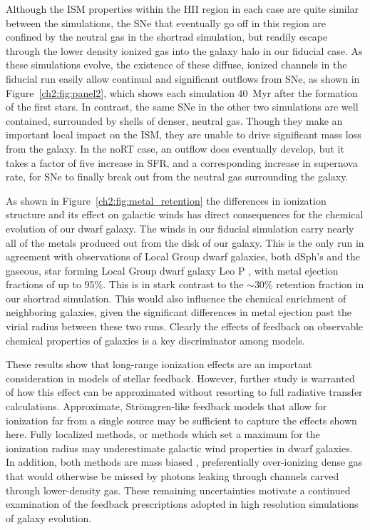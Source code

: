 Although the ISM properties within the HII region in each case are quite similar between the simulations, the SNe that eventually go off in this region are confined by the neutral gas in the shortrad simulation, but readily escape through the lower density ionized gas into the galaxy halo in our fiducial case. As these simulations evolve, the existence of these diffuse, ionized channels in the fiducial run easily allow continual and significant outflows from SNe, as shown in  Figure~\ref{ch2:fig:panel2}, which shows each simulation 40~Myr after the formation of the first stars. In contrast, the same SNe in the other two simulations are well contained, surrounded by shells of denser, neutral gas. Though they make an important local impact on the ISM, they are unable to drive significant mass loss from the galaxy. In the noRT case, an outflow does eventually develop, but it takes a factor of five increase in SFR, and a corresponding increase in supernova rate, for SNe to finally break out from the neutral gas surrounding the galaxy.

As shown in Figure~\ref{ch2:fig:metal_retention} the differences in ionization structure and its effect on galactic winds has direct consequences for the chemical evolution of our dwarf galaxy. The winds in our fiducial simulation carry nearly all of the metals produced out from the disk of our galaxy. This is the only run in agreement with observations of Local Group dwarf galaxies, both dSph's \citep{Kirby2011} and the gaseous, star forming Local Group dwarf galaxy Leo P \citep{McQuinn2015}, with metal ejection fractions of up to 95\%. This is in stark contrast to the $\sim$30\% retention fraction in our shortrad simulation. This would also influence the chemical enrichment of neighboring galaxies, given the significant differences in metal ejection past the virial radius between these two runs. Clearly the effects of feedback on observable chemical properties of galaxies is a key discriminator among models.

These results show that long-range ionization effects are an important consideration in models of stellar feedback. However,
further study is warranted of how this effect can be approximated without resorting to full radiative transfer calculations. Approximate, Str{\"o}mgren-like feedback models that allow for ionization far from a single source \citep[e.g.][]{Hopkins2018} may be sufficient to capture the effects shown here. Fully localized methods, or methods which set a maximum for the ionization radius may underestimate galactic wind properties in dwarf galaxies. In addition, both methods are mass biased \citep[see the discussion in ][]{Hu2017}, preferentially over-ionizing dense gas that would otherwise be missed by photons leaking through channels carved through lower-density gas. These remaining uncertainties motivate a continued examination of the feedback prescriptions adopted in high resolution simulations of galaxy evolution.

